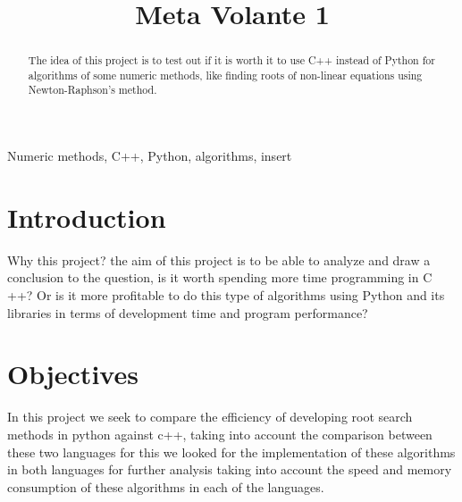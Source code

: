 \documentclass[conference]{IEEEtran}
\begin{document}
\title{Meta Volante 1}

\author{
\and
{}
\and
{}
\and
{}
}

\maketitle

\begin{abstract}
The idea of this project is to test out if it is worth it to use C++ instead of Python for
algorithms of some numeric methods, like finding roots of non-linear equations using
Newton-Raphson's method.
\end{abstract}

\begin{IEEEkeywords}
Numeric methods, C++, Python, algorithms, insert
\end{IEEEkeywords}

\section{Introduction}
Why this project? the aim of this project is to be able to analyze and draw a conclusion to 
the question, is it worth spending more time programming in C ++? Or is it more profitable to do 
this type of algorithms using Python and its libraries in terms of development time and program performance?

\section{Objectives}
In this project we seek to compare the efficiency of developing root search methods in python against c++, taking into account the comparison between these two languages for this we looked for the implementation of these algorithms in both languages for further analysis taking into account the speed and memory consumption of these algorithms in each of the languages.
\end{document}
